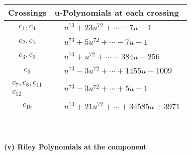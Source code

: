 \documentclass[1p]{elsarticle_modified}
\theoremstyle{definition}
\begin{document}
\begin{tabular}{m{50pt}|m{274pt}}
Crossings & \hspace{64pt}u-Polynomials at each crossing \\
\hline $$\begin{aligned}c_{1},c_{4}\end{aligned}$$&$\begin{aligned}
&u^{73}+23 u^{72}+\cdots-7 u-1
\end{aligned}$\\
\hline $$\begin{aligned}c_{2},c_{5}\end{aligned}$$&$\begin{aligned}
&u^{73}+5 u^{72}+\cdots-7 u-1
\end{aligned}$\\
\hline $$\begin{aligned}c_{3},c_{9}\end{aligned}$$&$\begin{aligned}
&u^{73}+u^{72}+\cdots-384 u-256
\end{aligned}$\\
\hline $$\begin{aligned}c_{6}\end{aligned}$$&$\begin{aligned}
&u^{73}-3 u^{72}+\cdots+1455 u-1009
\end{aligned}$\\
\hline $$\begin{aligned}c_{7},c_{8},c_{11}\\c_{12}\end{aligned}$$&$\begin{aligned}
&u^{73}-3 u^{72}+\cdots+5 u-1
\end{aligned}$\\
\hline $$\begin{aligned}c_{10}\end{aligned}$$&$\begin{aligned}
&u^{73}+21 u^{72}+\cdots+34585 u+3971
\end{aligned}$\\
\hline
\end{tabular}\\~\\
\newpage\renewcommand{\arraystretch}{1}
\flushleft \textbf{(v) Riley Polynomials at the component}\newline \\
\end{document}
